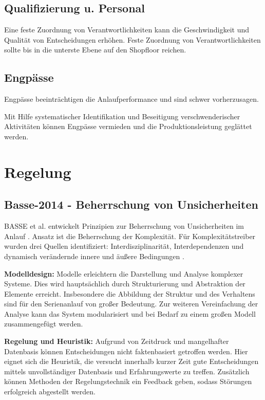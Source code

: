 \subsection*{Qualifizierung u. Personal}
Eine feste Zuordnung von Verantwortlichkeiten kann die Geschwindigkeit und Qualität von Entscheidungen erhöhen. 
Feste Zuordnung von Verantwortlichkeiten sollte bis in die unterste Ebene auf den Shopfloor reichen.


\subsection*{Engpässe}
Engpässe beeinträchtigen die Anlaufperformance und sind schwer vorherzusagen. 

Mit Hilfe systematischer Identifikation und Beseitigung verschwenderischer Aktivitäten können Engpässe vermieden und die Produktionsleistung geglättet werden. 

\section{Regelung}
\subsection*{Basse-2014 - Beherrschung von Unsicherheiten}

BASSE et al. entwickelt Prinzipien zur Beherrschung von Unsicherheiten im Anlauf \cite{Basse2014a}. Ansatz ist die Beherrschung der Komplexität. Für Komplexitätstreiber wurden drei Quellen identifiziert: Interdisziplinarität, Interdependenzen und dynamisch verändernde innere und äußere Bedingungen \cite{Basse2014a, Gartzen2012, Schuh2008}. %

\textbf{Modelldesign:} Modelle erleichtern die Darstellung und Analyse komplexer Systeme. Dies wird hauptsächlich durch Strukturierung und Abstraktion der Elemente erreicht. 
Insbesondere die Abbildung der Struktur und des Verhaltens sind für den Serienanlauf von großer Bedeutung. Zur weiteren Vereinfachung der Analyse kann das System modularisiert und bei Bedarf zu einem großen Modell zusammengefügt werden. 

\textbf{Regelung und Heuristik:} Aufgrund von Zeitdruck und mangelhafter Datenbasis können Entscheidungen nicht faktenbasiert getroffen werden. Hier eignet sich die Heuristik, die versucht innerhalb kurzer Zeit gute Entscheidungen mittels unvollständiger Datenbasis und Erfahrungswerte zu treffen. Zusätzlich können Methoden der Regelungstechnik ein Feedback geben, sodass Störungen erfolgreich abgestellt werden.


